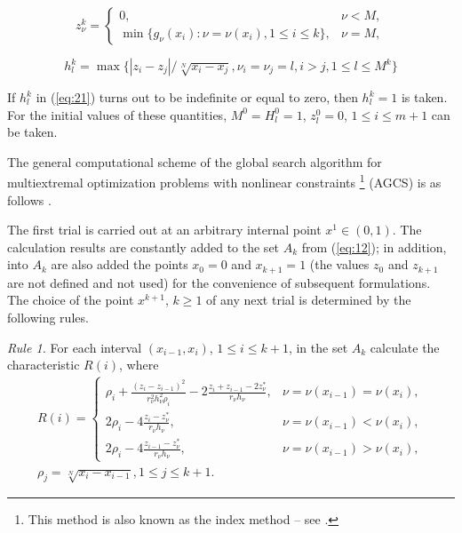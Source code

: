 \documentclass[smallextended]{svjour3}       %
\begin{document}
\begin{equation}\label{eq:20}
z^k_\nu = 
 \begin{cases}
   0, & \nu < M, \\
   \min{\{g_\nu(x_i):\nu=\nu(x_i), 1\leq i \leq k \}}, & \nu = M,
 \end{cases}
\end{equation}

\begin{equation}\label{eq:21}
h^k_l=\max{\{|z_i-z_j|/\sqrt[N]{x_i-x_j},\nu_i=\nu_j=l,i>j,1\leq l\leq M^k\}}
\end{equation}

If $h_l^k$ in (\ref{eq:21}) turns out to be indefinite or equal to zero, then $h_l^k=1$ is taken. For the initial values of these quantities, $M^0 = H_l^0=1$, $z_l^0=0$, $1 \leq i \leq m+1$ can be taken.

The general computational scheme of the global search algorithm for multiextremal optimization problems with nonlinear constraints \footnote{This method is also known as the index method -- see \cite{c18}.} (AGCS) is as follows \cite{c18}.

The first trial is carried out at an arbitrary internal point $x^1\in (0,1)$. The calculation results are constantly added to the set $A_k$ from (\ref{eq:12}); in addition, into $A_k$ are also added the points $x_0=0$ and $x_{k+1}=1$ (the values $z_0$ and $z_{k+1}$ are not defined and not used) for the convenience of subsequent formulations. The choice of the point $x^{k+1}$, $k\geq 1$ of any next trial is determined by the following rules.

\textit{Rule 1.} For each interval $(x_{i-1},x_i)$, $1 \leq i \leq k+1$, in the set $A_k$ calculate the characteristic $R(i)$, where
\begin{equation}\label{eq:22}
\begin{matrix}
R(i) = 
 \begin{cases}
   \rho_i + \frac{(z_i-z_{i-1})^2}{r^2_\nu h^2_\nu \rho_i} - 2 \frac{z_i+z_{i-1}-2z^*_\nu}{r_\nu h_\nu}, & \nu=\nu(x_{i-1})=\nu(x_i), \\
   2 \rho_i - 4\frac{z_i-z^*_\nu}{r_\nu h_\nu}, & \nu=\nu(x_{i-1})<\nu(x_i), \\
2 \rho_i - 4\frac{z_{i-1}-z^*_\nu}{r_\nu h_\nu}, & \nu=\nu(x_{i-1})>\nu(x_i), 
 \end{cases} \\
\rho_j = \sqrt[N]{x_i-x_{i-1}}, 1\leq j\leq k+1.
\end{matrix}
\end{equation}
\end{document}

